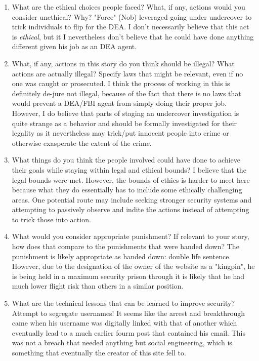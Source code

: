 \documentclass[letterpaper]{article}
\begin{document}
\begin{enumerate}
\item What are the ethical choices people faced? What, if any, actions
would you consider unethical? Why? "Force" (Nob) leveraged going
under undercover to trick individuals to flip for the DEA. I don't
necessarily believe that this act is \emph{ethical}, but it I nevertheless
don't believe that he could have done anything different given his
job as an DEA agent.

\item What, if any, actions in this story do you think should be illegal?
What actions are actually illegal? Specify laws that might be
relevant, even if no one was caught or prosecuted. I think the
process of working in this is definitely de-jure not illegal, because
of the fact that there is no laws that would prevent a DEA/FBI agent
from simply doing their proper job. However, I do believe that parts
of staging an undercover investigation is quite strange as a behavior
and should be formally investigated for their legality as it
nevertheless may trick/put innocent people into crime or otherwise
exasperate the extent of the crime.

\item What things do you think the people involved could have done to
achieve their goals while staying within legal and ethical bounds? I
believe that the legal bounds were met. However, the bounds of ethics
is harder to meet here because what they do essentially has to
include some ethically challenging areas. One potential route may
include seeking stronger security systems and attempting to passively
observe and indite the actions instead of attempting to trick those
into action.

\item What would you consider appropriate punishment? If relevant to your
story, how does that compare to the punishments that were handed
down? The punishment is likely appropriate as handed down: double
life sentence. However, due to the designation of the owner of the
website as a "kingpin", he is being held in a maximum security prison
through it is likely that he had much lower flight risk than others
in a similar position.

\item What are the technical lessons that can be learned to improve
security? Attempt to segregate usernames! It seems like the arrest
and breakthrough came when his username was digitally linked with
that of another which eventually lead to a much earlier fourm post
that contained his email. This was not a breach that needed anything
but social engineering, which is something that eventually the
creator of this site fell to.
\end{enumerate}
\end{document}
